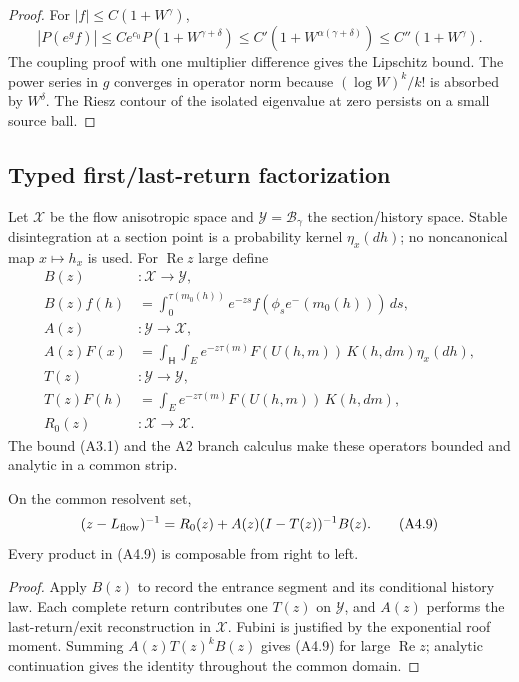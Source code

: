 \begin{proof}
For $|f|\le C(1+W^\gamma)$,
\[
 |P(e^gf)|\le C e^{c_0}P(1+W^{\gamma+\delta})
 \le C'(1+W^{\alpha(\gamma+\delta)})
 \le C''(1+W^\gamma).
\]
The coupling proof with one multiplier difference gives the Lipschitz bound.
The power series in $g$ converges in operator norm because
$(\log W)^k/k!$ is absorbed by $W^\delta$.  The Riesz contour of the isolated
eigenvalue at zero persists on a small source ball.
\end{proof}

\subsection{Typed first/last-return factorization}

Let $\mathcal X$ be the flow anisotropic space and $\mathcal Y=\mathcal
B_\gamma$ the section/history space.  Stable disintegration at a section
point is a probability kernel $\eta_x(dh)$; no noncanonical map $x\mapsto h_x$
is used.  For $\operatorname{Re}z$ large define
\begin{align*}
 B(z)&:\mathcal X\longrightarrow\mathcal Y,\\
 B(z)f(h)&=\int_0^{\tau(m_0(h))}
 e^{-zs}f(\phi_s e^-(m_0(h)))\,ds,\\
 A(z)&:\mathcal Y\longrightarrow\mathcal X,\\
 A(z)F(x)&=\int_{\mathsf H}\!\int_E
 e^{-z\tau(m)}F(U(h,m))\,K(h,dm)\eta_x(dh),\\
 T(z)&:\mathcal Y\longrightarrow\mathcal Y,\\
 T(z)F(h)&=\int_Ee^{-z\tau(m)}F(U(h,m))\,K(h,dm),\\
 R_0(z)&:\mathcal X\longrightarrow\mathcal X.
\end{align*}
The bound (A3.1) and the A2 branch calculus make these operators bounded and
analytic in a common strip.

\begin{proposition}
\label{prop:r27-a4-renewal}
On the common resolvent set,
\[
 (z-L_{\rm flow})^{-1}
 =R_0(z)+A(z)(I-T(z))^{-1}B(z).                           \tag{A4.9}
\]
Every product in (A4.9) is composable from right to left.
\end{proposition}

\begin{proof}
Apply $B(z)$ to record the entrance segment and its conditional history law.
Each complete return contributes one $T(z)$ on $\mathcal Y$, and $A(z)$
performs the last-return/exit reconstruction in $\mathcal X$.  Fubini is
justified by the exponential roof moment.  Summing
$A(z)T(z)^kB(z)$ gives (A4.9) for large $\operatorname{Re}z$; analytic
continuation gives the identity throughout the common domain.
\end{proof}

